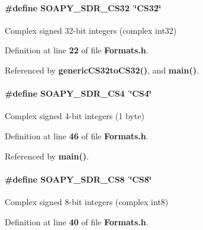 \paragraph[{S\+O\+A\+P\+Y\+\_\+\+S\+D\+R\+\_\+\+C\+S32}]{\setlength{\rightskip}{0pt plus 5cm}\#define S\+O\+A\+P\+Y\+\_\+\+S\+D\+R\+\_\+\+C\+S32~\char`\"{}C\+S32\char`\"{}}\label{Formats_8h_a7d7e929a16ab20496d473e91564781cb}


Complex signed 32-\/bit integers (complex int32) 



Definition at line {\bf 22} of file {\bf Formats.\+h}.



Referenced by {\bf generic\+C\+S32to\+C\+S32()}, and {\bf main()}.

\paragraph[{S\+O\+A\+P\+Y\+\_\+\+S\+D\+R\+\_\+\+C\+S4}]{\setlength{\rightskip}{0pt plus 5cm}\#define S\+O\+A\+P\+Y\+\_\+\+S\+D\+R\+\_\+\+C\+S4~\char`\"{}C\+S4\char`\"{}}\label{Formats_8h_ab74b4f2c94ac6fff156147d35cdd8b40}


Complex signed 4-\/bit integers (1 byte) 



Definition at line {\bf 46} of file {\bf Formats.\+h}.



Referenced by {\bf main()}.

\paragraph[{S\+O\+A\+P\+Y\+\_\+\+S\+D\+R\+\_\+\+C\+S8}]{\setlength{\rightskip}{0pt plus 5cm}\#define S\+O\+A\+P\+Y\+\_\+\+S\+D\+R\+\_\+\+C\+S8~\char`\"{}C\+S8\char`\"{}}\label{Formats_8h_ad9c5b2c82a9ee5a0e2361f5ecd229fd7}


Complex signed 8-\/bit integers (complex int8) 



Definition at line {\bf 40} of file {\bf Formats.\+h}.



